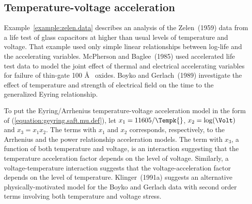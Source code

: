 \subsection{Temperature-voltage acceleration}
\label{section:temp.volt.acc.model}
Example~\ref{example:zelen.data} describes an analysis of the
Zelen~(1959) data from a life test of glass capacitors at higher
than usual levels of temperature and voltage. That example used only
simple linear relationships between log-life and the accelerating
variables.  McPherson and Baglee~(1985) used accelerated life test data
to model the joint effect of thermal and electrical accelerating
variables for failure of thin-gate 100 \AA \,\,\, oxides.  Boyko and
Gerlach~(1989) investigate the effect of temperature and strength of
electrical field on the time to the generalized Eyring relationship.

To put the Eyring/Arrhenius temperature-voltage acceleration model in
the form of (\ref{equation:geyring.saft.mu.def}), let $x_{1}=11605/
\Tempk{}$, $x_{2}=\log(\Volt)$ and $x_{3}=x_{1} x_{2}$. The terms with
$x_{1}$ and $x_{2}$ corresponds, respectively, to the Arrhenius and
the power relationship acceleration models. The term with $x_{3}$, a
function of both temperature and voltage, is an interaction
suggesting that the temperature acceleration factor depends on the
level of voltage.  Similarly, a voltage-temperature interaction
suggests that the voltage-acceleration factor depends on the level
of temperature.  Klinger~(1991a) suggests an alternative
physically-motivated model for the Boyko and Gerlach data with
second order terms involving both temperature and voltage stress.

